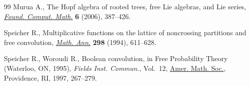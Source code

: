 \documentclass[11pt]{article}
\numberwithin{equation}{section}
\numberwithin{equation}{section}
\begin{document}
\begin{thebibliography}{99}
Murua A., The {H}opf algebra of rooted trees, free {L}ie algebras, and {L}ie
 series, \href{https://doi.org/10.1007/s10208-003-0111-0}{\textit{Found. Comput. Math.}} \textbf{6} (2006), 387--426.

Speicher R., Multiplicative functions on the lattice of noncrossing partitions
 and free convolution, \href{https://doi.org/10.1007/BF01459754}{\textit{Math. Ann.}} \textbf{298} (1994), 611--628.

Speicher R., Woroudi R., Boolean convolution, in Free Probability Theory
 ({W}aterloo, {ON}, 1995), \textit{Fields Inst. Commun.}, Vol.~12, \href{https://doi.org/10.1090/fic/012/13}{Amer. Math.
 Soc.}, Providence, RI, 1997, 267--279.

\end{thebibliography}
\end{document}
